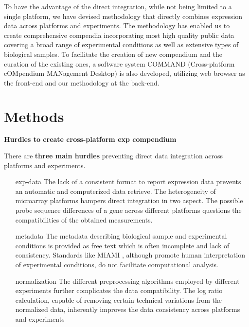 To have the advantage of the direct integration, while not being limited to a 
single platform, we have devised methodology that directly combines 
expression data across platforms and experiments. 
The methodology has enabled us to create comprehensive compendia incorporating 
most high quality public data covering a broad range of experimental 
conditions as well as extensive types of biological samples. 
To facilitate the creation of new compendium and the curation of the existing 
ones, a software system COMMAND (Cross-platform cOMpendium MANagement Desktop) 
is also developed, utilizing web browser as the front-end and our methodology 
at the back-end. 







\section{Methods}

\textbf{Hurdles to create cross-platform exp compendium}

There are \textbf{three main hurdles} preventing direct data integration across 
platforms and experiments.

\begin{itemize}

\item[exp-data]
The lack of a consistent format to report expression data prevents an automatic 
and computerized data retrieve.
%
The heterogeneity of microarray platforms hampers direct integration 
in two aspect.
The possible probe sequence differences of a gene across different platforms 
questions the compatibilities of the obtained measurements.

\item[metadata]
The metadata describing biological sample and experimental 
conditions is provided as free text which is often incomplete and lack of 
consistency. 
Standards like MIAMI \cite{Brazma2001, Brazma2009}, although promote human 
interpretation of experimental conditions, do not facilitate computational 
analysis.

\item[normalization] 
The different preprocessing algorithms employed by different experiments 
further complicates the data compatibility.
%
The log ratio calculation, capable of removing certain technical variations 
from the normalized data, inherently improves the data consistency across 
platforms and experiments \cite{Shi2006, Shi2008}

\end{itemize}



